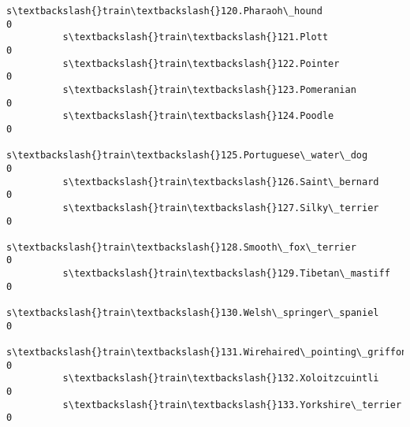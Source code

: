 \documentclass[11pt]{article}
\begin{document}
\begin{Verbatim}[commandchars=\\\{\}]
          s\textbackslash{}train\textbackslash{}120.Pharaoh\_hound                                       0   
          s\textbackslash{}train\textbackslash{}121.Plott                                               0   
          s\textbackslash{}train\textbackslash{}122.Pointer                                             0   
          s\textbackslash{}train\textbackslash{}123.Pomeranian                                          0   
          s\textbackslash{}train\textbackslash{}124.Poodle                                              0   
          s\textbackslash{}train\textbackslash{}125.Portuguese\_water\_dog                                0   
          s\textbackslash{}train\textbackslash{}126.Saint\_bernard                                       0   
          s\textbackslash{}train\textbackslash{}127.Silky\_terrier                                       0   
          s\textbackslash{}train\textbackslash{}128.Smooth\_fox\_terrier                                  0   
          s\textbackslash{}train\textbackslash{}129.Tibetan\_mastiff                                     0   
          s\textbackslash{}train\textbackslash{}130.Welsh\_springer\_spaniel                              0   
          s\textbackslash{}train\textbackslash{}131.Wirehaired\_pointing\_griffon                         0   
          s\textbackslash{}train\textbackslash{}132.Xoloitzcuintli                                      0   
          s\textbackslash{}train\textbackslash{}133.Yorkshire\_terrier                                   0   
          

\end{Verbatim}
\end{document}

